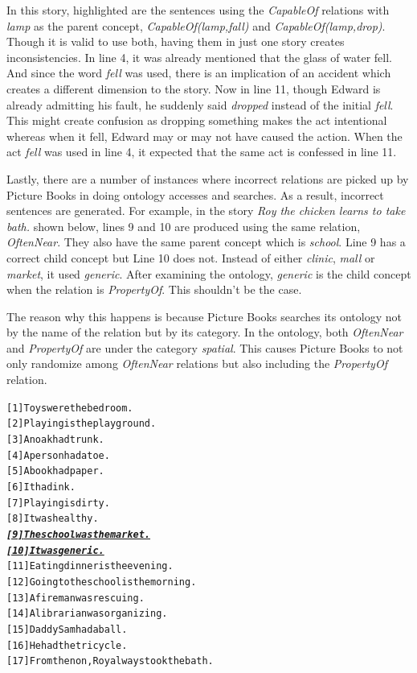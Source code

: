 In this story, highlighted are the sentences using the \textit{CapableOf} relations with \textit{lamp} as the parent concept, \textit{CapableOf(lamp,fall)} and \textit{CapableOf(lamp,drop)}. Though it is valid to use both, having them in just one story creates inconsistencies. In line 4, it was already mentioned that the glass of water fell. And since the word \textit{fell} was used, there is an implication of an accident which creates a different dimension to the story. Now in line 11, though Edward is already admitting his fault, he suddenly said \textit{dropped} instead of the initial \textit{fell}. This might create confusion as dropping something makes the act intentional whereas when it fell, Edward may or may not have caused the action. When the act \textit{fell} was used in line 4, it expected that the same act is confessed in line 11.

Lastly, there are a number of instances where incorrect relations are picked up by Picture Books in doing ontology accesses and searches. As a result, incorrect sentences are generated. For example, in the story \textit{Roy the chicken learns to take bath.} shown below, lines 9 and 10 are produced using the same relation, \textit{OftenNear}. They also have the same parent concept which is \textit{school}. Line 9 has a correct child concept but Line 10 does not. Instead of either \textit{clinic}, \textit{mall} or \textit{market}, it used \textit{generic}. After examining the ontology, \textit{generic} is the child concept when the relation is \textit{PropertyOf}. This shouldn't be the case. 

The reason why this happens is because Picture Books searches its ontology not by the name of the relation but by its category. In the ontology, both \textit{OftenNear} and \textit{PropertyOf} are under the category \textit{spatial}. This causes Picture Books to not only randomize among \textit{OftenNear} relations but also including the \textit{PropertyOf} relation.

\begin{alltt}
[1]  Toys were the bedroom.
[2]  Playing is the playground.
[3]  An oak had trunk.
[4]  A person had a toe.
[5]  A book had paper.
[6]  It had ink.
[7]  Playing is dirty.
[8]  It was healthy.
\underline{\emph{\textbf{[9]  The school was the market.}}}
\underline{\emph{\textbf{[10] It was generic.}}}
[11] Eating dinner is the evening.
[12] Going to the school is the morning.
[13] A fireman was rescuing.
[14] A librarian was organizing.
[15] Daddy Sam had a ball.
[16] He had the tricycle.
[17] From then on, Roy always took the bath.
\end{alltt}


